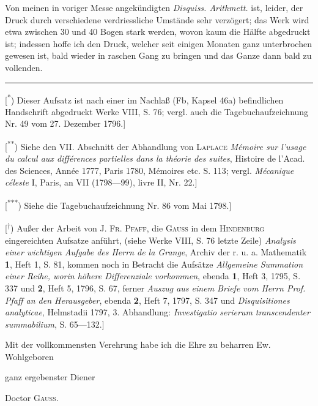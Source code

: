 \indent Von meinen in voriger Messe angekündigten \textit{Disquiss. Arithmett.} ist, leider, der Druck durch verschiedene verdriessliche Umstände sehr verzögert; das Werk wird etwa zwischen 30 und 40 Bogen stark werden, wovon kaum die Hälfte abgedruckt ist; indessen hoffe ich den Druck, welcher seit einigen Monaten ganz unterbrochen gewesen ist, bald wieder in raschen Gang zu bringen und das Ganze dann bald zu vollenden.
\par\medskip\noindent\rule{.24\linewidth}{.4pt}\par\smallskip
{\small
\noindent\hspace*{\parindent}[\textsuperscript{*}) Dieser Aufsatz ist nach einer im Nachlaß (Fb, Kapsel 46a) befindlichen Handschrift abgedruckt Werke VIII, S. 76; vergl. auch die Tagebuchaufzeichnung Nr. 49 vom 27. Dezember 1796.]
\par\noindent\hspace*{\parindent}[\textsuperscript{**}) Siehe den VII. Abschnitt der Abhandlung von \textsc{Laplace} \textit{Mémoire sur l’usage du calcul aux différences partielles dans la théorie des suites}, Histoire de l’Acad. des Sciences, Année 1777, Paris 1780, Mémoires etc. S. 113; vergl. \textit{Mécanique céleste} I, Paris, an VII (1798—99), livre II, Nr. 22.]
\par\noindent\hspace*{\parindent}[\textsuperscript{***}) Siehe die Tagebuchaufzeichnung Nr. 86 vom Mai 1798.]
\par\noindent\hspace*{\parindent}[\textsuperscript{\ensuremath{\dagger}}) Außer der Arbeit von \textsc{J. Fr. Pfaff}, die \textsc{Gauss} in dem \textsc{Hindenburg} eingereichten Aufsatze anführt, (siehe Werke VIII, S. 76 letzte Zeile) \textit{Analysis einer wichtigen Aufgabe des Herrn de la Grange}, Archiv der r. u. a. Mathematik \textbf{1}, Heft 1, S. 81, kommen noch in Betracht die Aufsätze \textit{Allgemeine Summation einer Reihe, worin höhere Differenziale vorkommen}, ebenda \textbf{1}, Heft 3, 1795, S. 337 und \textbf{2}, Heft 5, 1796, S. 67, ferner \textit{Auszug aus einem Briefe vom Herrn Prof. Pfaff an den Herausgeber}, ebenda \textbf{2}, Heft 7, 1797, S. 347 und \textit{Disquisitiones analyticae}, Helmstadii 1797, 3. Abhandlung: \textit{Investigatio serierum transcendenter summabilium}, S. 65—132.]
\par}
\clearpage{}
\indent Mit der vollkommensten Verehrung habe ich die Ehre zu beharren Ew. Wohlgeboren
\begin{flushright}ganz ergebenster Diener\par Doctor \textsc{Gauss}.\end{flushright}
